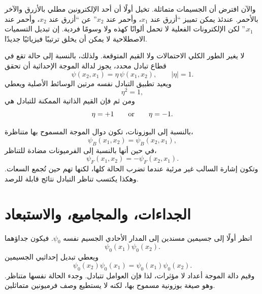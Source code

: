 والآن افترض أن الجسيمات متماثلة. تخيل أولًا أن أحد الإلكترونين مطلي بالأزرق والآخر بالأحمر. عندئذ يمكن تمييز ``أزرق عند \(x_1\)، وأحمر عند \(x_2\)'' عن ``أزرق عند \(x_2\)، وأحمر عند \(x_1\).'' لكن الإلكترونات الفعلية لا تحمل ألوانًا كهذه ولا وسومًا فردية. إن تبديل التسميات الاصطلاحية لا يمكن أن يخلق ترتيبًا فيزيائيًا جديدًا.

لا يغير الطور الكلي الاحتمالات ولا القيم المتوقعة. ولذلك، بالنسبة إلى حالة تقع في قطاع تبادل محدد، يجوز لدالة الموجة الإحداثية أن تحقق
\begin{equation}
\psi(x_2,x_1)=\eta\,\psi(x_1,x_2),
\qquad
\lvert\eta\rvert=1.
\end{equation}
ويعيد تطبيق التبادل نفسه مرتين الوسائط الأصلية ويعطي
\begin{equation}
\eta^2=1,
\end{equation}
ومن ثم فإن القيم الذاتية الممكنة للتبادل هي
\begin{equation}
\eta=+1
\qquad\hbox{or}\qquad
\eta=-1.
\end{equation}


بالنسبة إلى البوزونات، تكون دوال الموجة المسموح بها متناظرة،
\begin{equation}
\psi_B(x_1,x_2)=\psi_B(x_2,x_1),
\end{equation}
في حين أنها بالنسبة إلى الفرميونات مضادة للتناظر،
\begin{equation}
\psi_F(x_1,x_2)=-\psi_F(x_2,x_1).
\end{equation}
وتكون إشارة السالب غير مرئية عندما تضرب الحالة كلها، لكنها تهم حين تُجمع السعات. وهكذا يكتسب تناظر التبادل نتائج قابلة للرصد.

\section{الجداءات، والمجاميع، والاستبعاد}

انظر أولًا إلى جسيمين مسندين إلى المدار الأحادي الجسيم نفسه \(\psi_0\). فيكون جداؤهما
\begin{equation}
\psi_0(x_1)\psi_0(x_2).
\end{equation}
ويعطي تبديل إحداثيي الجسيمين
\begin{equation}
\psi_0(x_2)\psi_0(x_1)
=
\psi_0(x_1)\psi_0(x_2).
\end{equation}
وقيم دالة الموجة أعداد لا مؤثرات، لذا فإن العوامل تتبادل. وجدء الحالة نفسها متناظر. وهو صيغة بوزونية مسموح بها، لكنه لا يستطيع وصف فرميونين متماثلين.

